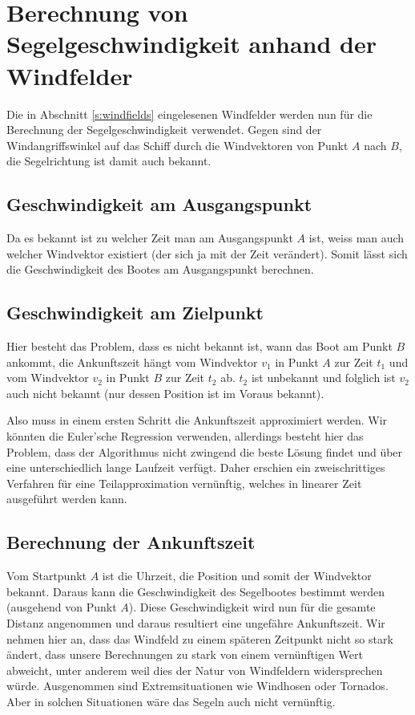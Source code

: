 
\section{Berechnung von Segelgeschwindigkeit anhand der Windfelder}
Die in Abschnitt \ref{s:windfields} eingelesenen Windfelder werden nun für die
Berechnung der Segelgeschwindigkeit verwendet. Gegen sind der
Windangriffswinkel auf das Schiff durch die Windvektoren von Punkt $A$ nach
$B$, die Segelrichtung ist damit auch bekannt.

 
\subsection{Geschwindigkeit am Ausgangspunkt}
Da es bekannt ist zu welcher Zeit man am Ausgangspunkt $A$ ist, weiss man auch
welcher Windvektor existiert (der sich ja mit der Zeit verändert). Somit lässt
sich die Geschwindigkeit des Bootes am Ausgangspunkt berechnen.

\subsection{Geschwindigkeit am Zielpunkt}
Hier besteht das Problem, dass es nicht bekannt ist, wann das Boot am Punkt $B$
ankommt, die Ankunftszeit hängt vom Windvektor $v_{1}$ in Punkt $A$ zur Zeit
$t_{1}$ und vom Windvektor $v_{2}$ in Punkt $B$ zur Zeit $t_{2}$ ab. $t_{2}$
ist unbekannt und folglich ist $v_{2}$ auch nicht bekannt (nur dessen Position
ist im Voraus bekannt).

Also muss in einem ersten Schritt die Ankunftszeit approximiert werden.  Wir
könnten die Euler'sche Regression verwenden, allerdings besteht hier das
Problem, dass der Algorithmus nicht zwingend die beste Lösung findet und über
eine unterschiedlich lange Laufzeit verfügt. Daher erschien ein zweischrittiges
Verfahren für eine Teilapproximation vernünftig, welches in linearer Zeit
ausgeführt werden kann.

\subsection{Berechnung der Ankunftszeit}
Vom Startpunkt $A$ ist die Uhrzeit, die Position und somit der Windvektor
bekannt. Daraus kann die Geschwindigkeit des Segelbootes bestimmt werden
(ausgehend von Punkt $A$). Diese Geschwindigkeit wird nun für die gesamte
Distanz angenommen und daraus resultiert eine ungefähre Ankunftszeit. Wir
nehmen hier an, dass das Windfeld zu einem späteren Zeitpunkt nicht so stark
ändert, dass unsere Berechnungen zu stark von einem vernünftigen Wert abweicht,
unter anderem weil dies der Natur von Windfeldern widersprechen würde.
Ausgenommen sind Extremsituationen wie Windhosen oder Tornados. Aber in solchen
Situationen wäre das Segeln auch nicht vernünftig.

